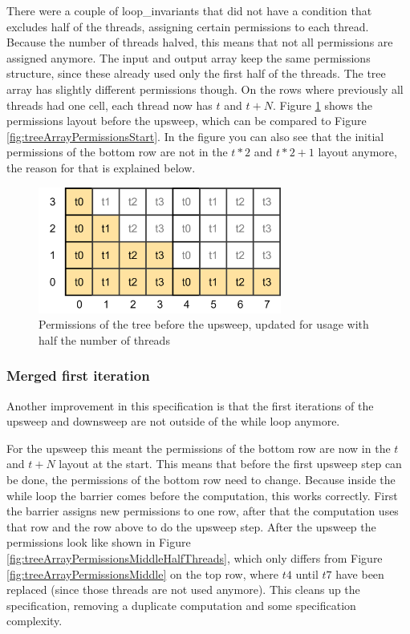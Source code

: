 \documentclass[a4paper]{article}
\begin{document}
There were a couple of loop\_invariants that did not have a condition that excludes half of the threads, assigning certain permissions to each thread. Because the number of threads halved, this means that not all permissions are assigned anymore. The input and output array keep the same permissions structure, since these already used only the first half of the threads. The tree array has slightly different permissions though. On the rows where previously all threads had one cell, each thread now has $t$ and $t+N$. Figure \ref{fig:treeArrayPermissionsStartHalfThreads} shows the permissions layout before the upsweep, which can be compared to Figure \ref{fig:treeArrayPermissionsStart}. In the figure you can also see that the initial permissions of the bottom row are not in the $t*2$ and $t*2+1$ layout anymore, the reason for that is explained below.

\begin{figure}[htb!]
	\centering
	\includegraphics[width=80mm]{../images/tree-permissions-start-halfthreads-v1.png}
	\caption{Permissions of the tree before the upsweep, updated for usage with half the number of threads}
	\label{fig:treeArrayPermissionsStartHalfThreads}
\end{figure}
\FloatBarrier

\subsubsection{Merged first iteration}
Another improvement in this specification is that the first iterations of the upsweep and downsweep are not outside of the while loop anymore.

For the upsweep this meant the permissions of the bottom row are now in the $t$ and $t+N$ layout at the start. This means that before the first upsweep step can be done, the permissions of the bottom row need to change. Because inside the while loop the barrier comes before the computation, this works correctly. First the barrier assigns new permissions to one row, after that the computation uses that row and the row above to do the upsweep step. After the upsweep the permissions look like shown in Figure \ref{fig:treeArrayPermissionsMiddleHalfThreads}, which only differs from Figure \ref{fig:treeArrayPermissionsMiddle} on the top row, where $t4$ until $t7$ have been replaced (since those threads are not used anymore). This cleans up the specification, removing a duplicate computation and some specification complexity.
\end{document}
